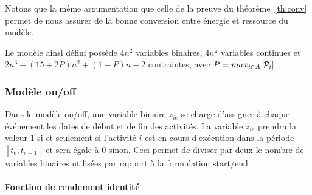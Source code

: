 Notons que la même argumentation que celle de la preuve du
théorème~\ref{th:conv} permet de nous assurer de la bonne conversion
entre énergie et ressource du modèle. 

Le modèle ainsi défini possède $4n^2$ variables binaires, $4n^2$
variables continues et $2n^3+ (15 + 2P)n^2+\left(1-P\right)n-2$
contraintes, avec $P=max_{i\in A}|\P_i|$.

\subsubsection{Modèle on/off}

Dans le modèle on/off, une variable binaire $z_{ie}$ se charge
d'assigner à chaque événement les dates de début et de fin des
activités. La variable $z_{ie}$ prendra la valeur $1$ si et seulement
si l'activité $i$ est en cours d'exécution dans la période
$[t_e,t_{e+1}]$ et sera égale à $0$ sinon. Ceci permet de diviser par
deux le nombre de variables binaires utilisées par rapport à la
formulation start/end.

\paragraph{Fonction de rendement identité}

